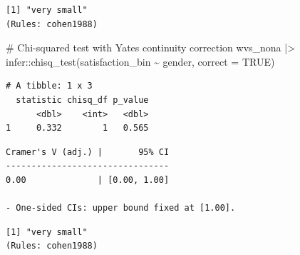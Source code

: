 \documentclass[
  letterpaper,
]{krantz}
\makeatletter
\newenvironment{Shaded}{\begin{snugshade}}{\end{snugshade}}
\newcommand{\AttributeTok}[1]{\textcolor[rgb]{0.40,0.45,0.13}{#1}}
\newcommand{\CommentTok}[1]{\textcolor[rgb]{0.37,0.37,0.37}{#1}}
\newcommand{\ConstantTok}[1]{\textcolor[rgb]{0.56,0.35,0.01}{#1}}
\newcommand{\DocumentationTok}[1]{\textcolor[rgb]{0.37,0.37,0.37}{\textit{#1}}}
\newcommand{\FunctionTok}[1]{\textcolor[rgb]{0.28,0.35,0.67}{#1}}
\newcommand{\NormalTok}[1]{\textcolor[rgb]{0.00,0.23,0.31}{#1}}
\newcommand{\OtherTok}[1]{\textcolor[rgb]{0.00,0.23,0.31}{#1}}
\newcommand{\SpecialCharTok}[1]{\textcolor[rgb]{0.37,0.37,0.37}{#1}}
\newcommand{\StringTok}[1]{\textcolor[rgb]{0.13,0.47,0.30}{#1}}
\newenvironment{kframe}{%
\medskip{}
\setlength{\fboxsep}{.8em}
 \def\at@end@of@kframe{}%
 \ifinner\ifhmode%
  \def\at@end@of@kframe{\end{minipage}}%
  \begin{minipage}{\columnwidth}%
 \fi\fi%
 \def\FrameCommand##1{\hskip\@totalleftmargin \hskip-\fboxsep
 \colorbox{shadecolor}{##1}\hskip-\fboxsep
     \hskip-\linewidth \hskip-\@totalleftmargin \hskip\columnwidth}%
 \MakeFramed {\advance\hsize-\width
   \@totalleftmargin\z@ \linewidth\hsize
   \@setminipage}}%
 {\par\unskip\endMakeFramed%
 \at@end@of@kframe}
\renewenvironment{Shaded}{\begin{kframe}}{\end{kframe}}
\makeatother
\begin{document}
\begin{verbatim}
[1] "very small"
(Rules: cohen1988)
\end{verbatim}

\begin{Shaded}
\begin{Highlighting}[]
\CommentTok{\# Chi{-}squared test with Yate\textquotesingle{}s continuity correction}
\NormalTok{wvs\_nona }\SpecialCharTok{|\textgreater{}}\NormalTok{ infer}\SpecialCharTok{::}\FunctionTok{chisq\_test}\NormalTok{(satisfaction\_bin }\SpecialCharTok{\textasciitilde{}}\NormalTok{ gender,}
                               \AttributeTok{correct =} \ConstantTok{TRUE}\NormalTok{)}
\end{Highlighting}
\end{Shaded}

\begin{verbatim}
# A tibble: 1 x 3
  statistic chisq_df p_value
      <dbl>    <int>   <dbl>
1     0.332        1   0.565
\end{verbatim}

\begin{Shaded}
\end{Shaded}

\begin{verbatim}
Cramer's V (adj.) |       95% CI
--------------------------------
0.00              | [0.00, 1.00]

- One-sided CIs: upper bound fixed at [1.00].
\end{verbatim}

\begin{Shaded}
\end{Shaded}

\begin{verbatim}
[1] "very small"
(Rules: cohen1988)
\end{verbatim}
\end{document}

